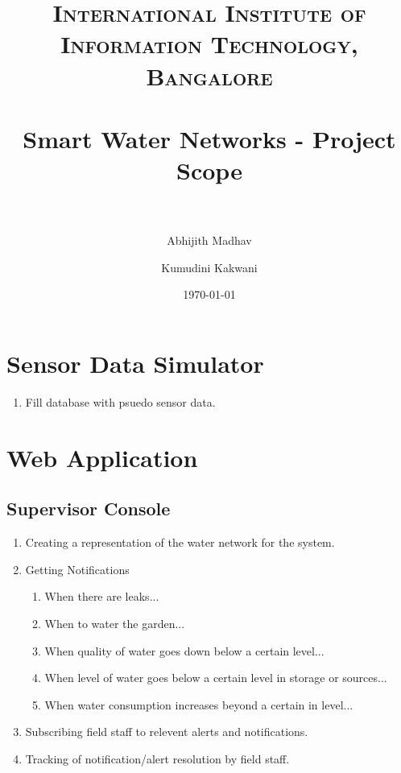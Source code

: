 \documentclass[paper=a4, fontsize=11pt]{scrartcl} %
\title{	
\normalfont \normalsize 
\textsc{International Institute of Information Technology, Bangalore} \\ [25pt] %
\horrule{0.5pt} \\[0.4cm] %
\huge Smart Water Networks - Project Scope \\ %
\horrule{2pt} \\[0.5cm] %
}
\author{Abhijith Madhav \and Kumudini Kakwani} %
\date{\normalsize\today} %
\numberwithin{equation}{section} %
\numberwithin{figure}{section} %
\numberwithin{table}{section} %
\begin{document}
\maketitle %


\section{Sensor Data Simulator}
\begin{enumerate}
\item
Fill database with psuedo sensor data.
\end{enumerate}

\section{Web Application}

\subsection{Supervisor Console}
\begin{enumerate}
\item
Creating a representation of the water network for the system.
\item 
Getting Notifications
\begin{enumerate}
\item
When there are leaks...
\item
When to water the garden...
\item
When quality of water goes down below a certain level...
\item
When level of water goes below a certain level in storage or sources...
\item
When water consumption increases beyond a certain in level...
\end{enumerate}
\item
Subscribing field staff to relevent alerts and notifications.
\item
Tracking of notification/alert resolution by field staff.
\end{enumerate}
\end{document}
